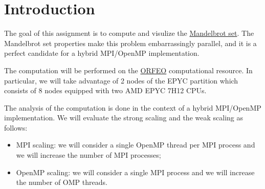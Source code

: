 \section{Introduction}

The goal of this assignment is to compute and visulize the \href{https://en.wikipedia.org/wiki/Mandelbrot_set}{Mandelbrot set}. The Mandelbrot set properties make this problem embarrassingly parallel, and it is a perfect candidate for a hybrid MPI/OpenMP implementation.

The computation will be performed on the \href{https://orfeo-doc.areasciencepark.it/}{ORFEO} computational resource. In particular, we will take advantage of 2 nodes of the EPYC partition which consists of 8 nodes equipped with two AMD EPYC 7H12 CPUs.

The analysis of the computation is done in the context of a hybrid MPI/OpenMP implementation. We will evaluate the strong scaling and the weak scaling as follows:
\begin{itemize}
    \item MPI scaling: we will consider a single OpenMP thread per MPI process and we will increase the number of MPI processes;
    \item OpenMP scaling: we will consider a single MPI process and we will increase the number of OMP threads.
\end{itemize}
